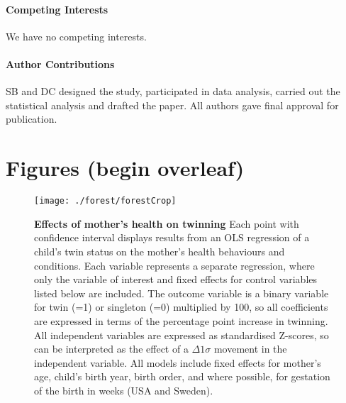 \documentclass[11pt]{article}
\begin{document}
\paragraph{Competing Interests} We have no competing interests.
\paragraph{Author Contributions} SB and DC designed the study, participated in data analysis, carried out the statistical analysis and drafted the paper. All authors gave final approval for publication.

\section*{Figures (begin overleaf)}
\clearpage
\begin{figure}
  \begin{center}
    \texttt{[image: ./forest/forestCrop]}
  \end{center}
  \caption{\textbf{Effects of mother's health on twinning} {\footnotesize Each point with confidence interval displays results from an OLS regression of a child's twin status on the mother's health behaviours and conditions. Each variable represents a separate regression, where only the variable of interest and fixed effects for control variables listed below are included. The outcome variable is a binary variable for twin (=1) or singleton (=0) multiplied by 100, so all coefficients are expressed in terms of the percentage point increase in twinning.  All independent variables are expressed as standardised Z-scores, so can be interpreted as the effect of a $\Delta 1\sigma$ movement in the independent variable. All models include fixed effects for mother's age, child's birth year, birth order, and where possible, for gestation of the birth in weeks (USA and Sweden).}}
  \label{fig:fullEsts}
  \end{figure}
\thispagestyle{empty}

%
\clearpage
\end{document}
